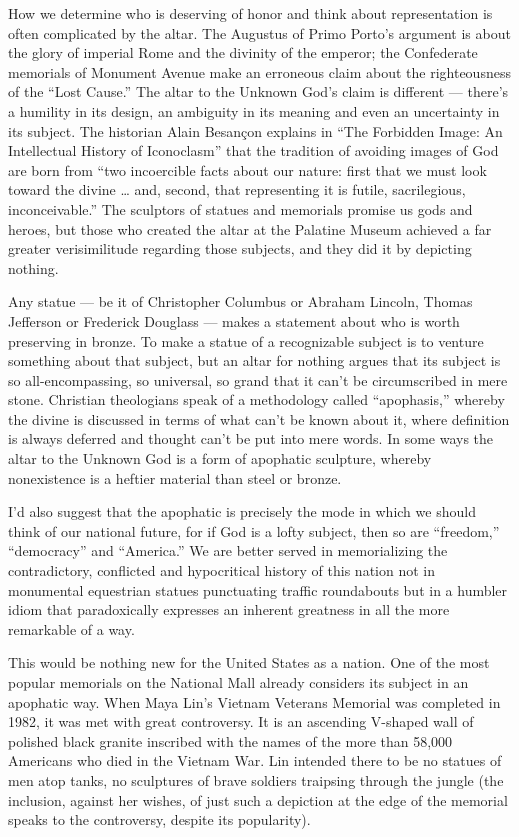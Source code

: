 How we determine who is deserving of honor and think about
representation is often complicated by the altar. The Augustus of Primo
Porto's argument is about the glory of imperial Rome and the divinity of
the emperor; the Confederate memorials of Monument Avenue make an
erroneous claim about the righteousness of the ``Lost Cause.'' The altar
to the Unknown God's claim is different --- there's a humility in its
design, an ambiguity in its meaning and even an uncertainty in its
subject. The historian Alain Besançon explains in ``The Forbidden Image:
An Intellectual History of Iconoclasm'' that the tradition of avoiding
images of God are born from ``two incoercible facts about our nature:
first that we must look toward the divine \ldots{} and, second, that
representing it is futile, sacrilegious, inconceivable.'' The sculptors
of statues and memorials promise us gods and heroes, but those who
created the altar at the Palatine Museum achieved a far greater
verisimilitude regarding those subjects, and they did it by depicting
nothing.

Any statue --- be it of Christopher Columbus or Abraham Lincoln, Thomas
Jefferson or Frederick Douglass --- makes a statement about who is worth
preserving in bronze. To make a statue of a recognizable subject is to
venture something about that subject, but an altar for nothing argues
that its subject is so all-encompassing, so universal, so grand that it
can't be circumscribed in mere stone. Christian theologians speak of a
methodology called ``apophasis,'' whereby the divine is discussed in
terms of what can't be known about it, where definition is always
deferred and thought can't be put into mere words. In some ways the
altar to the Unknown God is a form of apophatic sculpture, whereby
nonexistence is a heftier material than steel or bronze.

I'd also suggest that the apophatic is precisely the mode in which we
should think of our national future, for if God is a lofty subject, then
so are ``freedom,'' ``democracy'' and ``America.'' We are better served
in memorializing the contradictory, conflicted and hypocritical history
of this nation not in monumental equestrian statues punctuating traffic
roundabouts but in a humbler idiom that paradoxically expresses an
inherent greatness in all the more remarkable of a way.

This would be nothing new for the United States as a nation. One of the
most popular memorials on the National Mall already considers its
subject in an apophatic way. When Maya Lin's Vietnam Veterans Memorial
was completed in 1982, it was met with great controversy. It is an
ascending V-shaped wall of polished black granite inscribed with the
names of the more than 58,000 Americans who died in the Vietnam War. Lin
intended there to be no statues of men atop tanks, no sculptures of
brave soldiers traipsing through the jungle (the inclusion, against her
wishes, of just such a depiction at the edge of the memorial speaks to
the controversy, despite its popularity).


